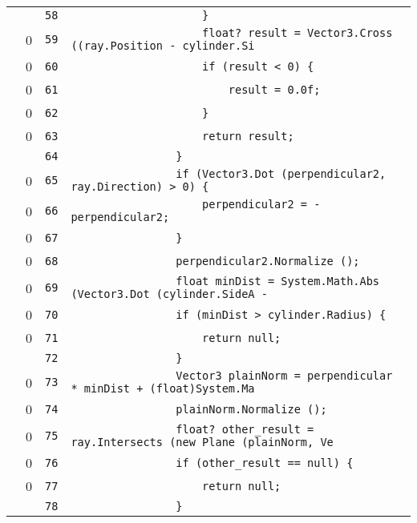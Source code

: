 \documentclass[a4paper,10pt]{article}
\begin{document}
\begin{longtable}[l]{lrrl}
\cellcolor{gray} &  & \verb~58~ & \verb~                    }~\\
\cellcolor{red} & 0 & \verb~59~ & \verb~                    float? result = Vector3.Cross ((ray.Position - cylinder.Si~\\
\cellcolor{red} & 0 & \verb~60~ & \verb~                    if (result < 0) {~\\
\cellcolor{red} & 0 & \verb~61~ & \verb~                        result = 0.0f;~\\
\cellcolor{red} & 0 & \verb~62~ & \verb~                    }~\\
\cellcolor{red} & 0 & \verb~63~ & \verb~                    return result;~\\
\cellcolor{gray} &  & \verb~64~ & \verb~                }~\\
\cellcolor{red} & 0 & \verb~65~ & \verb~                if (Vector3.Dot (perpendicular2, ray.Direction) > 0) {~\\
\cellcolor{red} & 0 & \verb~66~ & \verb~                    perpendicular2 = -perpendicular2;~\\
\cellcolor{red} & 0 & \verb~67~ & \verb~                }~\\
\cellcolor{red} & 0 & \verb~68~ & \verb~                perpendicular2.Normalize ();~\\
\cellcolor{red} & 0 & \verb~69~ & \verb~                float minDist = System.Math.Abs (Vector3.Dot (cylinder.SideA -~\\
\cellcolor{red} & 0 & \verb~70~ & \verb~                if (minDist > cylinder.Radius) {~\\
\cellcolor{red} & 0 & \verb~71~ & \verb~                    return null;~\\
\cellcolor{gray} &  & \verb~72~ & \verb~                }~\\
\cellcolor{red} & 0 & \verb~73~ & \verb~                Vector3 plainNorm = perpendicular * minDist + (float)System.Ma~\\
\cellcolor{red} & 0 & \verb~74~ & \verb~                plainNorm.Normalize ();~\\
\cellcolor{red} & 0 & \verb~75~ & \verb~                float? other_result = ray.Intersects (new Plane (plainNorm, Ve~\\
\cellcolor{red} & 0 & \verb~76~ & \verb~                if (other_result == null) {~\\
\cellcolor{red} & 0 & \verb~77~ & \verb~                    return null;~\\
\cellcolor{gray} &  & \verb~78~ & \verb~                }~\\

\end{longtable}
\end{document}
